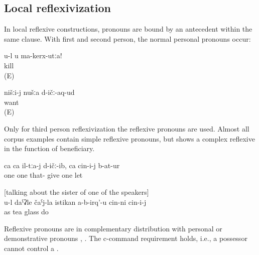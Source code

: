 \subsection{Local reflexivization}
\label{ssec:Local reflexivization}

In local reflexive constructions, pronouns are bound by an antecedent within the same clause. With first and second person, the normal personal pronouns occur:

\begin{exe}
	\ex	\label{ex:Do not kill yourself}
	\gll	u-l	u	ma-kerx-utːa!\\
				kill\\
	\glt	{} (E)

	\ex	\label{ex:‎We love us}
	\gll	nišːi-j	nušːa	d-ičː-aq-ud\\
				want\\
	\glt	{} (E) 
\end{exe}

Only for third person reflexivization the reflexive pronouns are used. Almost all corpus examples contain simple reflexive pronouns, but  shows a complex reflexive in the function of beneficiary.

\begin{exe}
	\ex	\label{ex:(The boy) gave them one pear each, one he kept for himself@1}
	\gll	ca	ca	il-tːa-j	d-ičː-ib,	ca	cin-i-j	b-at-ur\\
		one	one	that-	give	one		let\\
	\glt	{}

	\ex	\label{ex:She does not make herself a glass of tea like you@10} [talking about the sister of one of the speakers]\\
	\gll	u-l	daˁʡle	čaˁj-la	istikan	a-b-irq'-u	cin-ni cin-i-j\\
			as	tea	glass	do		\\
	\glt	 {}
\end{exe}

Reflexive pronouns are in complementary distribution with personal or demonstrative pronouns , . The c-command requirement holds, i.e., a possessor cannot control a  .


